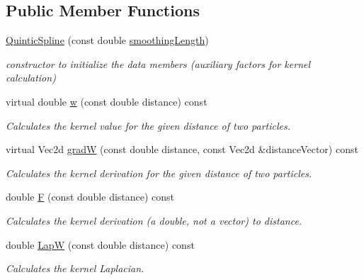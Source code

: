 \subsection*{Public Member Functions}
\begin{CompactItemize}
\item 
\hypertarget{classQuinticSpline_e2d0a39985327a020d2794516f895f27}{
\hyperlink{classQuinticSpline_e2d0a39985327a020d2794516f895f27}{QuinticSpline} (const double \hyperlink{classKernel_f088821dba4a00d1d320b27ebcb71258}{smoothingLength})}
\label{classQuinticSpline_e2d0a39985327a020d2794516f895f27}

\begin{CompactList}\small\item\em constructor to initialize the data members (auxiliary factors for kernel calculation) \item\end{CompactList}\item 
virtual double \hyperlink{classQuinticSpline_021acaeb55230bf10cf3a2c634381088}{w} (const double distance) const 
\begin{CompactList}\small\item\em Calculates the kernel value for the given distance of two particles. \item\end{CompactList}\item 
virtual Vec2d \hyperlink{classQuinticSpline_00a31074e58e60a4721144e4935c56b2}{gradW} (const double distance, const Vec2d \&distanceVector) const 
\begin{CompactList}\small\item\em Calculates the kernel derivation for the given distance of two particles. \item\end{CompactList}\item 
\hypertarget{classQuinticSpline_67fa50759531bbbbef728d28282788e7}{
double \hyperlink{classQuinticSpline_67fa50759531bbbbef728d28282788e7}{F} (const double distance) const }
\label{classQuinticSpline_67fa50759531bbbbef728d28282788e7}

\begin{CompactList}\small\item\em Calculates the kernel derivation (a double, not a vector) to distance. \item\end{CompactList}\item 
\hypertarget{classQuinticSpline_adc23e95cd346c434b423b3276156e8c}{
double \hyperlink{classQuinticSpline_adc23e95cd346c434b423b3276156e8c}{LapW} (const double distance) const }
\label{classQuinticSpline_adc23e95cd346c434b423b3276156e8c}

\begin{CompactList}\small\item\em Calculates the kernel Laplacian. \item\end{CompactList}\end{CompactItemize}
